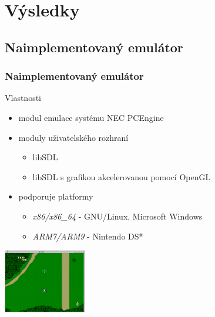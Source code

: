 \documentclass[10pt]{beamer}
\begin{document}
\section{Výsledky}

\subsection{Naimplementovaný emulátor}
\begin{frame}
\frametitle{Naimplementovaný emulátor}
\begin{block}{Vlastnosti}
\begin{itemize}
	\item modul emulace systému NEC PCEngine
	\item moduly uživatelského rozhraní
	\begin{itemize}
		\item libSDL
		\item libSDL s grafikou akcelerovanou pomocí OpenGL
	\end{itemize}
	\item podporuje platformy
	\begin{itemize}
		\item {\em x86/x86\_64} - {\footnotesize GNU/Linux, Microsoft Windows}
		\item {\em ARM7/ARM9} - {\footnotesize Nintendo DS*}
	\end{itemize}
\end{itemize}
\end{block}
\vglue 2.5mm
\begin{center}
\includegraphics[width=3.6cm]{fig/bc_emu_ss4}
\end{center}
\end{frame}


\end{document}

